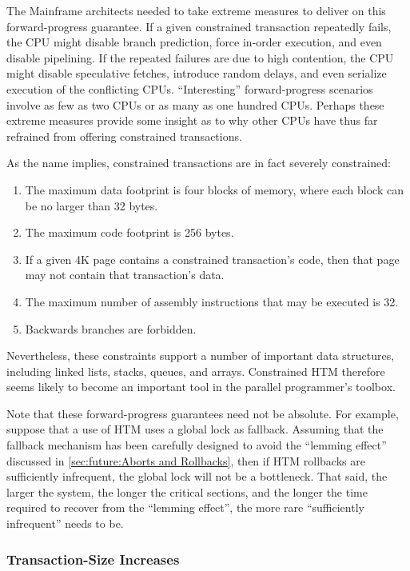 The Mainframe architects needed to take extreme measures to deliver on
this forward-progress guarantee.
If a given constrained transaction repeatedly fails, the CPU
might disable branch prediction, force in-order execution, and even
disable pipelining.
If the repeated failures are due to high contention, the CPU might
disable speculative fetches, introduce random delays, and even
serialize execution of the conflicting CPUs.
``Interesting'' forward-progress scenarios involve as few as two CPUs
or as many as one hundred CPUs.
Perhaps these extreme measures provide some insight as to why other CPUs
have thus far refrained from offering constrained transactions.

As the name implies, constrained transactions are in fact severely constrained:

\begin{enumerate}
\item	The maximum data footprint is four blocks of memory,
	where each block can be no larger than 32 bytes.
\item	The maximum code footprint is 256 bytes.
\item	If a given 4K page contains a constrained transaction's code,
	then that page may not contain that transaction's data.
\item	The maximum number of assembly instructions that may be executed
	is 32.
\item	Backwards branches are forbidden.
\end{enumerate}

Nevertheless, these constraints support a number of important data structures,
including linked lists, stacks, queues, and arrays.
Constrained HTM therefore seems likely to become an important tool in
the parallel programmer's toolbox.

Note that these forward-progress guarantees need not be absolute.
For example, suppose that a use of HTM uses a global lock as fallback.
Assuming that the fallback mechanism has been carefully designed to
avoid the ``lemming effect'' discussed in
\cref{sec:future:Aborts and Rollbacks},
then if HTM rollbacks are sufficiently infrequent, the global lock
will not be a bottleneck.
That said, the larger the system, the longer the critical sections,
and the longer the time required to recover from the ``lemming effect'',
the more rare ``sufficiently infrequent'' needs to be.

\subsubsection{Transaction-Size Increases}
\label{sec:future:Transaction-Size Increases}

